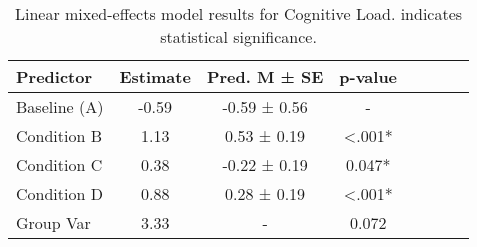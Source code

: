
    \begin{table}[H]
    \centering
    \begin{small}
    \begin{tabular}{lccccccc}
\toprule
Predictor & Estimate & Pred. M ± SE & p-value \\
\midrule
Baseline (A) & -0.59 & -0.59 ± 0.56 & - \\
Condition B & 1.13 & 0.53 ± 0.19 & <.001* \\
Condition C & 0.38 & -0.22 ± 0.19 & 0.047* \\
Condition D & 0.88 & 0.28 ± 0.19 & <.001* \\
Group Var & 3.33 & - & 0.072 \\
\bottomrule
\end{tabular}

    \end{small}
    \caption[Linear mixed-effects model results for Cognitive Load]{Linear mixed-effects model results for Cognitive Load. \newline * indicates statistical significance.}
    \label{tab:cognitiveload}

    \end{table}
